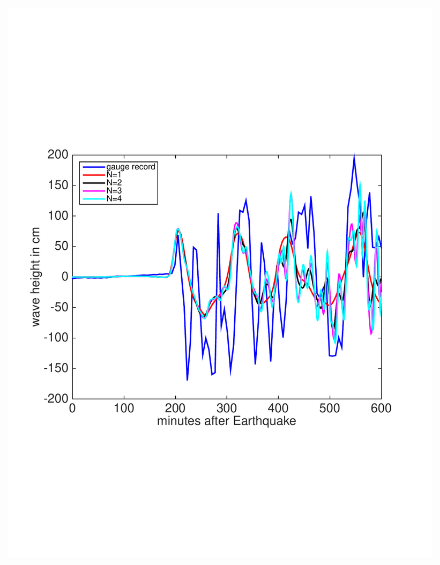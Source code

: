 \begin{figure}
\begin{center}
{\begin{minipage}[c]{0.45\linewidth}
      \centering%
      \includegraphics[trim=0cm 6cm 2cm 7cm,clip=true,width=\textwidth]{./figures/tuticorinGaugeCon.pdf}
  \end{minipage}}\\
\end{center}
\end{figure}
